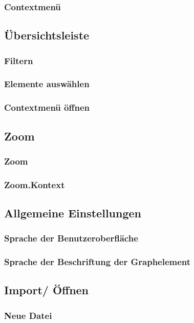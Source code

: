 \documentclass[enabledeprecatedfontcommands,fontsize=11pt,paper=a4,twoside]{scrartcl}
\begin{document}
		\subsubsection{Contextmenü}
	
	\subsection{Übersichtsleiste} \label{overwiew}
		\subsubsection{Filtern}
		\subsubsection{Elemente auswählen}
		\subsubsection{Contextmenü öffnen}
		
	\subsection{Zoom} \label{zoom}
		\subsubsection{Zoom}
		\subsubsection{Zoom.Kontext}
	\subsection{Allgemeine Einstellungen} \label{settings}
		\subsubsection{Sprache der Benutzeroberfläche}
		\subsubsection{Sprache der Beschriftung der Graphelement}
	\subsection{Import/ Öffnen} \label{import}
		\subsubsection{Neue Datei}
\end{document}
